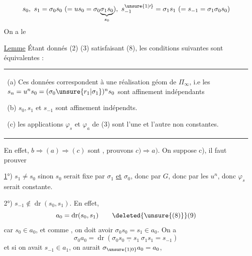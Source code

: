 \[ s_0,\ s_1=\sigma_0s_0\ (=us_0=\sigma_0\underset{s_0}{\underbrace{\sigma_1s_0}}),\ s_{-1}^{\unsure{1|\prime}}=\sigma_1s_1\ (=s_{-1}=\sigma_1\sigma_0s_0) \]
On a le

\uline{Lemme} Étant donnés (2) (3) satisfaisant (8),
les conditions suivantes sont équivalentes :

\begin{tabular}{|p{.91\linewidth}}(a) Ces données correspondent à une réalisation
géom de $\Pi_\infty$, i.e les $s_n=u^n s_0=(\sigma_0\unsure{r_1|\sigma_1})^n s_0$
sont affinement indépendants

(b) $s_0,s_1$ et $s_{-1}$ sont affinement indépendts.

(c) les applications $\varphi_s$ et $\varphi_a$ de (3) sont
l'une et l'autre non constantes.\end{tabular}

En effet, $b\Rightarrow(a)\Rightarrow(c)$ sont , prouvons
$c)\Rightarrow a)$. On suppose c), il faut prouver

\uline{1}°) $s_1\ne s_0$ sinon $s_0$ serait fixe par $\sigma_1$ \uline{et} $\sigma_0$,
donc par $G$, donc par les $u^n$, donc $\varphi_s$ serait
constante.

2°) $s_{-1}\notin\operatorname{dr}(s_0,s_1)$. En effet, 
\[ a_0=\operatorname{dr}(s_0,s_1) \tag*{\deleted{\unsure{(8)}}(9)} \]
car $s_0\in a_0$, et comme  , on doit
avoir $\sigma_0s_0=s_1\in a_0$.  On a
\[ \sigma_0a_0=\operatorname{dr}(\sigma_0s_0\underset{,}{=}s_1\ \sigma_1s_1=s_{-1}) \]
et si on avait $s_{-1}\in a_1$, on aurait $\sigma_{\unsure{1|0}}a_0=a_0$,
